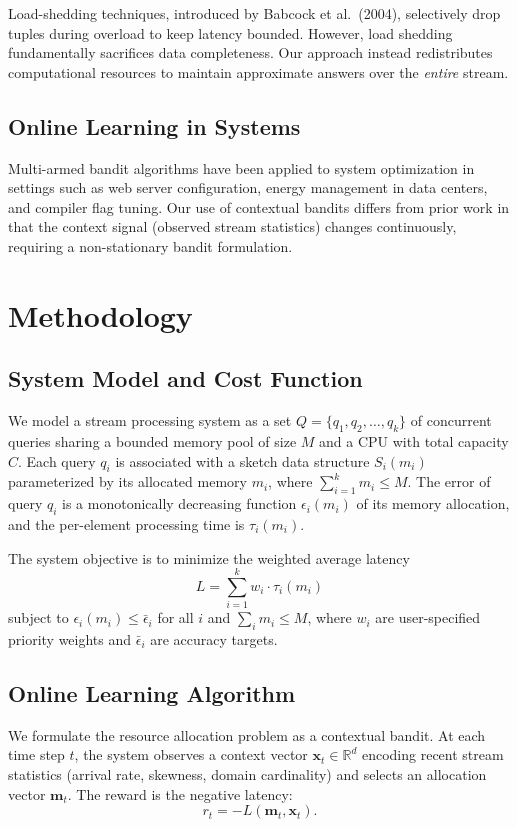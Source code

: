 \documentclass[
    language=english,
    doctype=dissertation,
    institution=none,
    titlestyle=book,
]{../../omnilatex}
\begin{document}
Load-shedding techniques, introduced by Babcock et al.\ (2004), selectively drop tuples during overload to keep latency bounded. However, load shedding fundamentally sacrifices data completeness. Our approach instead redistributes computational resources to maintain approximate answers over the \emph{entire} stream.

\section{Online Learning in Systems}

Multi-armed bandit algorithms have been applied to system optimization in settings such as web server configuration, energy management in data centers, and compiler flag tuning. Our use of contextual bandits differs from prior work in that the context signal (observed stream statistics) changes continuously, requiring a non-stationary bandit formulation.

\chapter{Methodology}\label{ch:methodology}

\section{System Model and Cost Function}

We model a stream processing system as a set $Q = \{q_1, q_2, \dots, q_k\}$ of concurrent queries sharing a bounded memory pool of size $M$ and a CPU with total capacity $C$. Each query $q_i$ is associated with a sketch data structure $S_i(m_i)$ parameterized by its allocated memory $m_i$, where $\sum_{i=1}^{k} m_i \leq M$. The error of query $q_i$ is a monotonically decreasing function $\epsilon_i(m_i)$ of its memory allocation, and the per-element processing time is $\tau_i(m_i)$.

The system objective is to minimize the weighted average latency
\[
L = \sum_{i=1}^{k} w_i \cdot \tau_i(m_i)
\]
subject to $\epsilon_i(m_i) \leq \bar{\epsilon}_i$ for all $i$ and $\sum_{i} m_i \leq M$, where $w_i$ are user-specified priority weights and $\bar{\epsilon}_i$ are accuracy targets.

\section{Online Learning Algorithm}

We formulate the resource allocation problem as a contextual bandit. At each time step $t$, the system observes a context vector $\mathbf{x}_t \in \mathbb{R}^d$ encoding recent stream statistics (arrival rate, skewness, domain cardinality) and selects an allocation vector $\mathbf{m}_t$. The reward is the negative latency:
\[
r_t = -L(\mathbf{m}_t, \mathbf{x}_t).
\]
\end{document}

